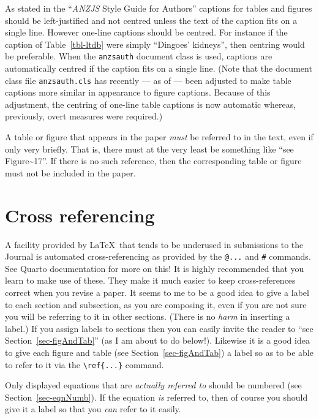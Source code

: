\documentclass[
doublespace,
  times]{anzsauth}
\begin{document}
As stated in the ``\emph{ANZJS} Style Guide for Authors'' captions for
tables and figures should be left-justified and not centred unless the
text of the caption fits on a single line. However one-line captions
should be centred. For instance if the caption of Table~\ref{tbl-ltdb}
were simply ``Dingoes' kidneys'', then centring would be preferable.
When the \texttt{anzsauth} document class is used, captions are
automatically centred if the caption fits on a single line. (Note that
the document class file \texttt{anzsauth.cls} has recently --- as of
 --- been adjusted to make table captions more
similar in appearance to figure captions. Because of this adjustment,
the centring of one-line table captions is now automatic whereas,
previously, overt measures were required.)

A table or figure that appears in the paper \emph{must} be referred to
in the text, even if only very briefly. That is, there must at the very
least be something like ``see Figure\textasciitilde17''. If there is no
such reference, then the corresponding table or figure must not be
included in the paper.

\section{Cross referencing}\label{sec-crossref}

A facility provided by \LaTeX~that tends to be underused in submissions
to the Journal is automated cross-referencing as provided by the
\texttt{@...} and \texttt{\#} commands. See Quarto documentation for
more on this! It is highly recommended that you learn to make use of
these. They make it much easier to keep cross-references correct when
you revise a paper. It seems to me to be a good idea to give a label to
each section and subsection, as you are composing it, even if you are
not sure you will be referring to it in other sections. (There is no
\emph{harm} in inserting a label.) If you assign labels to sections then
you can easily invite the reader to ``see Section~\ref{sec-figAndTab}''
(as I am about to do below!). Likewise it is a good idea to give each
figure and table (see Section~\ref{sec-figAndTab}) a label so as to be
able to refer to it via the \texttt{\textbackslash{}ref\{...\}} command.

Only displayed equations that are \emph{actually referred to} should be
numbered (see Section~\ref{sec-eqnNumb}). If the equation \emph{is}
referred to, then of course you should give it a label so that you
\emph{can} refer to it easily.
\end{document}
